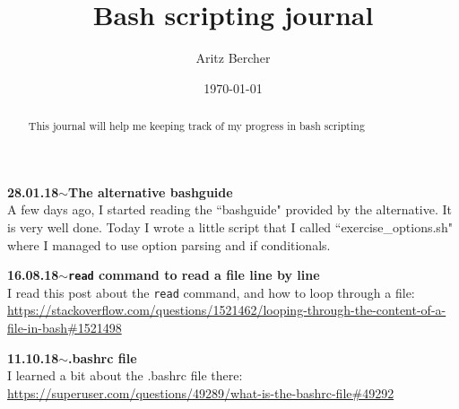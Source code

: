 \documentclass[11pt,a4paper]{article}
\title{Bash scripting journal}
\author{Aritz Bercher}
\date{\today}
\newenvironment{loggentry}[2]%
{\noindent\textbf{#1}\hspace{1cm}$\mathbf{\sim}$\text{ }\textbf{#2}\\}{\vspace{0.5cm}}
\begin{document}
\maketitle

\begin{abstract}
This journal will help me keeping track of my progress in bash scripting
\end{abstract}

\begin{loggentry}{28.01.18}{The alternative bashguide}
A few days ago, I started reading the ``bashguide" provided by the alternative. It is very well done. Today I wrote a little script that I called ``exercise\_options.sh" where I managed to use option parsing and if conditionals.
\end{loggentry}

\begin{loggentry}{16.08.18}{\texttt{read} command to read a file line by line}

I read this post about the \texttt{read} command, and how to loop through a file:\\
\url{https://stackoverflow.com/questions/1521462/looping-through-the-content-of-a-file-in-bash#1521498}\\

\end{loggentry}

\begin{loggentry}{11.10.18}{.bashrc file}

I learned a bit about the .bashrc file there:\\
\url{https://superuser.com/questions/49289/what-is-the-bashrc-file#49292}\\



\end{loggentry}
\end{document}
